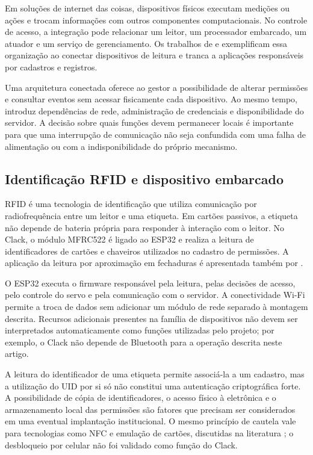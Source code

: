 \documentclass[12pt]{article}
\begin{document}
Em soluções de internet das coisas, dispositivos físicos executam medições ou ações e trocam informações com outros componentes computacionais. No controle de acesso, a integração pode relacionar um leitor, um processador embarcado, um atuador e um serviço de gerenciamento. Os trabalhos de \cite{goncalves2019rfidweb} e \cite{lima2025trancadura} exemplificam essa organização ao conectar dispositivos de leitura e tranca a aplicações responsáveis por cadastros e registros.

Uma arquitetura conectada oferece ao gestor a possibilidade de alterar permissões e consultar eventos sem acessar fisicamente cada dispositivo. Ao mesmo tempo, introduz dependências de rede, administração de credenciais e disponibilidade do servidor. A decisão sobre quais funções devem permanecer locais é importante para que uma interrupção de comunicação não seja confundida com uma falha de alimentação ou com a indisponibilidade do próprio mecanismo.

\subsection{Identificação RFID e dispositivo embarcado}

RFID é uma tecnologia de identificação que utiliza comunicação por radiofrequência entre um leitor e uma etiqueta. Em cartões passivos, a etiqueta não depende de bateria própria para responder à interação com o leitor. No Clack, o módulo MFRC522 é ligado ao ESP32 e realiza a leitura de identificadores de cartões e chaveiros utilizados no cadastro de permissões. A aplicação da leitura por aproximação em fechaduras é apresentada também por \cite{borin2023fechadura}.

O ESP32 executa o firmware responsável pela leitura, pelas decisões de acesso, pelo controle do servo e pela comunicação com o servidor. A conectividade Wi-Fi permite a troca de dados sem adicionar um módulo de rede separado à montagem descrita. Recursos adicionais presentes na família de dispositivos não devem ser interpretados automaticamente como funções utilizadas pelo projeto; por exemplo, o Clack não depende de Bluetooth para a operação descrita neste artigo.

A leitura do identificador de uma etiqueta permite associá-la a um cadastro, mas a utilização do UID por si só não constitui uma autenticação criptográfica forte. A possibilidade de cópia de identificadores, o acesso físico à eletrônica e o armazenamento local das permissões são fatores que precisam ser considerados em uma eventual implantação institucional. O mesmo princípio de cautela vale para tecnologias como NFC e emulação de cartões, discutidas na literatura \cite{bispo2019rfid}; o desbloqueio por celular não foi validado como função do Clack.
\end{document}
